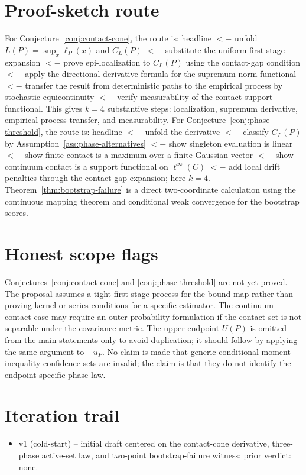 \documentclass[11pt]{article}
\theoremstyle{definition}
\theoremstyle{plain}
\theoremstyle{remark}
\begin{document}
\section{Proof-sketch route}
For Conjecture~\ref{conj:contact-cone}, the route is: headline \(<-\) unfold \(L(P)=\sup_x\ell_P(x)\) and \(C_L(P)\) \(<-\) substitute the uniform first-stage expansion \(<-\) prove epi-localization to \(C_L(P)\) using the contact-gap condition \(<-\) apply the directional derivative formula for the supremum norm functional \(<-\) transfer the result from deterministic paths to the empirical process by stochastic equicontinuity \(<-\) verify measurability of the contact support functional.  This gives \(k=4\) substantive steps: localization, supremum derivative, empirical-process transfer, and measurability.  For Conjecture~\ref{conj:phase-threshold}, the route is: headline \(<-\) unfold the derivative \(<-\) classify \(C_L(P)\) by Assumption~\ref{ass:phase-alternatives} \(<-\) show singleton evaluation is linear \(<-\) show finite contact is a maximum over a finite Gaussian vector \(<-\) show continuum contact is a support functional on \(\ell^\infty(C)\) \(<-\) add local drift penalties through the contact-gap expansion; here \(k=4\).  Theorem~\ref{thm:bootstrap-failure} is a direct two-coordinate calculation using the continuous mapping theorem and conditional weak convergence for the bootstrap scores.

\section{Honest scope flags}
Conjectures~\ref{conj:contact-cone} and \ref{conj:phase-threshold} are not yet proved.  The proposal assumes a tight first-stage process for the bound map rather than proving kernel or series conditions for a specific estimator.  The continuum-contact case may require an outer-probability formulation if the contact set is not separable under the covariance metric.  The upper endpoint \(U(P)\) is omitted from the main statements only to avoid duplication; it should follow by applying the same argument to \(-u_P\).  No claim is made that generic conditional-moment-inequality confidence sets are invalid; the claim is that they do not identify the endpoint-specific phase law.

\section{Iteration trail}
\begin{itemize}[leftmargin=*]
  \item v1 (cold-start) -- initial draft centered on the contact-cone derivative, three-phase active-set law, and two-point bootstrap-failure witness; prior verdict: none.
\end{itemize}
\end{document}
